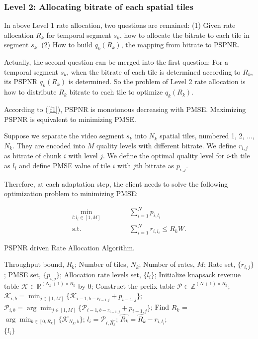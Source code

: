 \subsubsection{Level 2: Allocating bitrate of each spatial tiles}

In above Level 1 rate allocation, two questions are remained: (1) Given rate allocation $R_k$ for temporal segment $s_k$, how to allocate the bitrate to each tile in segment $s_k$. (2) How to build $q_k(R_k)$, the mapping from bitrate to PSPNR. 

Actually, the second question can be merged into the first question: For a temporal segment $s_k$, when the bitrate of each tile is determined according to $R_k$, its PSPNR $q_k(R_k)$ is determined. So the problem of Level 2 rate allocation is how to distribute $R_k$ bitrate to each tile to optimize $q_k(R_k)$.

According to (\ref{f1}), PSPNR is monotonous decreasing with PMSE. Maximizing PSPNR is equivalent to minimizing PMSE.

Suppose we separate the video segment $s_k$ into $N_k$ spatial tiles, numbered 1, 2, ..., $N_k$. They are encoded into $M$ quality levels with different bitrate. We define $r_{i, j}$ as bitrate of chunk $i$ with level $j$. We define the optimal quality level for $i$-th tile as $l_i$ and define PMSE value of tile $i$ with $j$th bitrate as $p_{i, j}$.

Therefore, at each adaptation step, the client needs to solve the following optimization problem to minimizing PMSE:

\begin{equation}
\begin{aligned}
\min_{l: l_i \in [1, M]} \text{~~~~~~} & \text{~~~~} \sum_{i = 1}^N p_{i, l_i} \\
\text{s.t.} \text{~~~~} & \text{~~~~}\sum_{i=1}^N r_{i,l_i} \le R_kW.
\end{aligned}
\end{equation}

\begin{algorithm}[t]
\caption{ PSPNR driven Rate Allocation Algorithm.}
\label{alg:Framwork}
\begin{algorithmic}[1]
\Require
Throughput bound, $R_k$;
Number of tiles, $N_k$;
Number of rates, $M$;
Rate set, $\{r_{i,j}\}$;
PMSE set, $\{p_{i,j}\}$;
\Ensure
Allocation rate levels set, $\{l_i\}$;
\State Initialize knapsack revenue table $\mathcal{K}\in \mathbb{R}^{(N_k+1)\times R_k}$ by 0;
\State Construct the prefix table $\mathcal{P}\in \mathbb{Z}^{(N+1)\times R_k}$;
    \State $\mathcal{K}_{i,b} = \min_{j\in[1,M]}\{\mathcal{K}_{i-1,b-r_{i-1,j}} + p_{i-1,j}\}$;
    \State $\mathcal{P}_{i,b} = \arg\min_{j\in[1,M]}\{\mathcal{P}_{i-1,b-r_{i-1,j}} + p_{i-1,j}\}$;
  \EndFor
\EndFor
\State Find $\hat{R_k}$ = $\arg\min_{b\in [0,R_k]} \{\mathcal{K}_{N_k,b}\}$;
  \State $l_i = \mathcal{P}_{i,\hat{R_k}}$;
  \State $\hat{R_k} = \hat{R_k} - r_{i,l_i}$;
\EndFor \\
\Return $\{l_i\}$
\end{algorithmic}
\end{algorithm}

